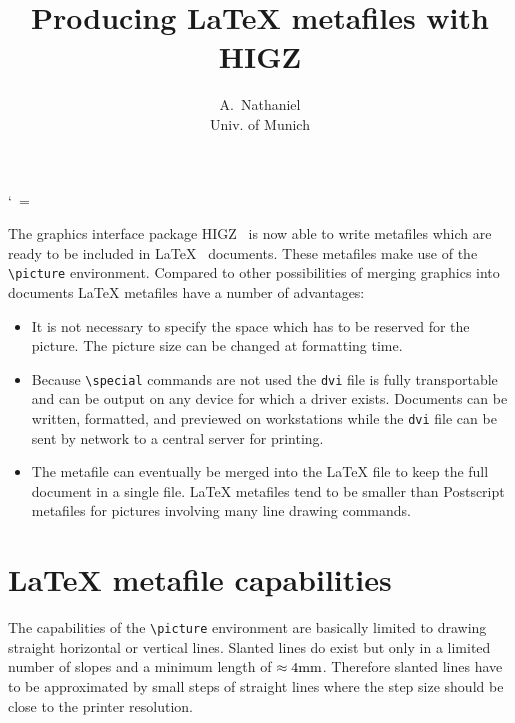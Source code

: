 
\def\listing#1{
  \parindent=0pt \par
  \begingroup
    \def\par{\leavevmode\endgraf}
    \footnotesize \tt
    \obeylines \obeyspaces \frenchspacing
    \def\do##1{ \catcode`##1=12 } \dospecials
    \vobeyspaces
    #1
  \endgroup
}
{\catcode`\ =\active\gdef\vobeyspaces{\catcode`\ \active \let \xobeysp}}
\def\xobeysp{\leavevmode{} }




\title{Producing \LaTeX{} metafiles with HIGZ}
\author{A.~Nathaniel \\
        Univ. of Munich}
\date{}
\maketitle

The graphics interface package HIGZ~\cite{HIGZ} is now able to write 
metafiles which are ready to be included in \LaTeX{}~\cite{LATEX} documents.
These metafiles make use of the \verb'\picture' environment.
Compared to other possibilities of merging graphics
into documents \LaTeX{} metafiles have a number of advantages:

\begin{itemize}
\item 
It is not necessary to specify the space which has to be reserved for
the picture.
The picture size can be changed at formatting time.
\item
Because \verb'\special' commands are not used
the {\tt dvi} file is fully transportable and can be output on any device 
for which a driver exists.
Documents can be written, formatted, and previewed on workstations
while the {\tt dvi} file can be sent by network to a central server for
printing.
\item
The metafile can eventually be merged into the \LaTeX{} file to keep the 
full document in a single file.
\LaTeX{} metafiles tend to be smaller than Postscript metafiles
for pictures involving many line drawing commands.
\end{itemize}

\section{\LaTeX{} metafile capabilities}

The capabilities of the \verb'\picture' environment are basically
limited to drawing straight horizontal or vertical lines.
Slanted lines do exist but only in a limited number of slopes and 
a minimum length of $\approx 4 {\rm mm}$.
Therefore slanted lines have to be approximated by small steps of
straight lines where the step size should be close to the printer resolution.

